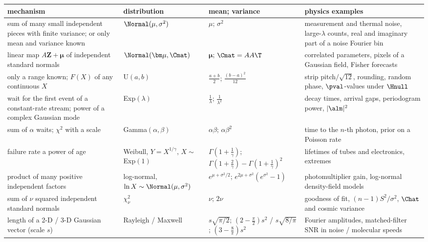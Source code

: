 \begin{taxonomy}
\centering\footnotesize
\renewcommand{\arraystretch}{1.22}
\begin{tabularx}{\linewidth}{@{}>{\raggedright\arraybackslash}p{3.55cm}>{\raggedright\arraybackslash}p{2.05cm}>{\raggedright\arraybackslash}p{3.0cm}>{\raggedright\arraybackslash}X@{}}
\textbf{mechanism} & \textbf{distribution} & \textbf{mean; variance} & \textbf{physics examples}\\\hline
sum of many small independent pieces with finite variance; or only mean and variance known & $\Normal(\mu,\sigma^2)$ & $\mu$; $\sigma^2$ & measurement and thermal noise, large-$\lambda$ counts, real and imaginary part of a noise Fourier bin\\
linear map $A\bm Z+\bm\mu$ of independent standard normals & $\Normal(\bm\mu,\Cmat)$ & $\bm\mu$; $\Cmat=AA\T$ & correlated parameters, pixels of a Gaussian field, Fisher forecasts\\
only a range known; $F(X)$ of any continuous $X$ & U$(a,b)$ & $\frac{a+b}2$; $\frac{(b-a)^2}{12}$ & strip pitch$/\sqrt{12}$, rounding, random phase, $\pval$-values under $\Hnull$\\
wait for the first event of a constant-rate stream; power of a complex Gaussian mode & Exp$(\lambda)$ & $\frac1\lambda$; $\frac1{\lambda^2}$ & decay times, arrival gaps, periodogram power, $|\alm|^2$\\
sum of $\alpha$ waits; $\chi^2$ with a scale & Gamma$(\alpha,\beta)$ & $\alpha\beta$; $\alpha\beta^2$ & time to the $n$-th photon, prior on a Poisson rate\\
failure rate a power of age & Weibull, $Y=X^{1/\gamma}$, $X\sim$ Exp$(1)$ & $\Gamma(1+\frac1\gamma)$; $\Gamma(1+\frac2\gamma)-\Gamma(1+\frac1\gamma)^2$ & lifetimes of tubes and electronics, extremes\\
product of many positive independent factors & log-normal, $\ln X\sim\Normal(\mu,\sigma^2)$ & $e^{\mu+\sigma^2/2}$; $e^{2\mu+\sigma^2}(e^{\sigma^2}-1)$ & photomultiplier gain, log-normal density-field models\\
sum of $\nu$ squared independent standard normals & $\chi^2_\nu$ & $\nu$; $2\nu$ & goodness of fit, $(n-1)S^2/\sigma^2$, $\Chat$ and cosmic variance\\
length of a 2-D / 3-D Gaussian vector (scale $s$) & Rayleigh / Maxwell & $s\sqrt{\pi/2}$; $(2-\frac\pi2)s^2$ \;/\; $s\sqrt{8/\pi}$; $(3-\frac8\pi)s^2$ & Fourier amplitudes, matched-filter SNR in noise / molecular speeds\\

\end{tabularx}
\end{taxonomy}
